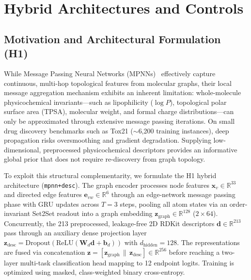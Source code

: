 \section{Hybrid Architectures and Controls}
\label{sec:hybrid}

\subsection{Motivation and Architectural Formulation (H1)}
While Message Passing Neural Networks (MPNNs)~\cite{gilmer2017neural} effectively capture continuous, multi-hop topological features from molecular graphs, their local message aggregation mechanism exhibits an inherent limitation: whole-molecule physicochemical invariants---such as lipophilicity ($\log P$), topological polar surface area (TPSA), molecular weight, and formal charge distributions---can only be approximated through extensive message passing iterations. On small drug discovery benchmarks such as Tox21 ($\sim$6,200 training instances), deep propagation risks oversmoothing and gradient degradation. Supplying low-dimensional, preprocessed physicochemical descriptors provides an informative global prior that does not require re-discovery from graph topology.

To exploit this structural complementarity, we formulate the H1 hybrid architecture (\texttt{mpnn+desc}). The graph encoder processes node features $\mathbf{x}_v \in \mathbb{R}^{33}$ and directed edge features $\mathbf{e}_{vw} \in \mathbb{R}^6$ through an edge-network message passing phase with GRU updates across $T=3$ steps, pooling all atom states via an order-invariant Set2Set readout into a graph embedding $\mathbf{z}_{\text{graph}} \in \mathbb{R}^{128}$ ($2 \times 64$). Concurrently, the 213 preprocessed, leakage-free 2D RDKit descriptors $\mathbf{d} \in \mathbb{R}^{213}$ pass through an auxiliary dense projection layer $\mathbf{z}_{\text{desc}} = \text{Dropout}(\text{ReLU}(\mathbf{W}_d \mathbf{d} + \mathbf{b}_d))$ with $d_{\text{hidden}} = 128$. The representations are fused via concatenation $\mathbf{z} = [\mathbf{z}_{\text{graph}} \,\|\, \mathbf{z}_{\text{desc}}] \in \mathbb{R}^{256}$ before reaching a two-layer multi-task classification head mapping to 12 endpoint logits. Training is optimized using masked, class-weighted binary cross-entropy.

